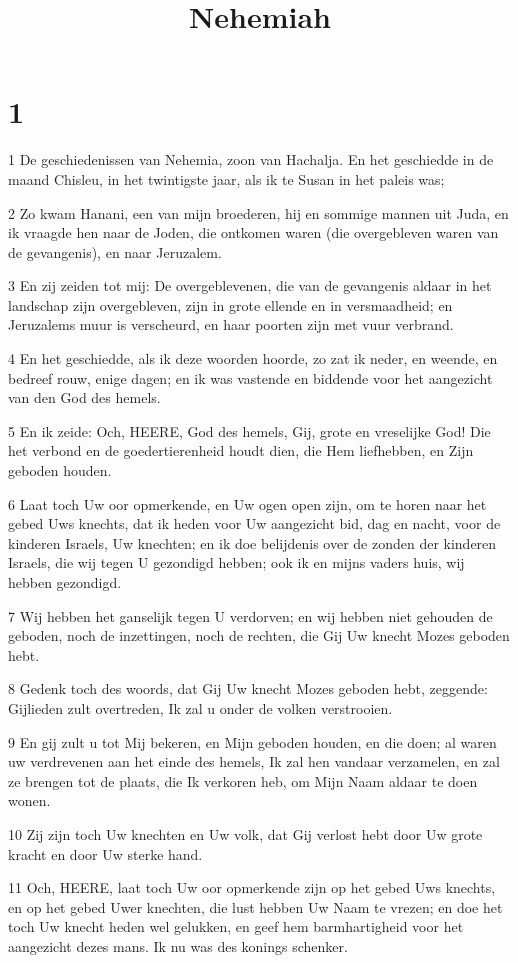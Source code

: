

\title{Nehemiah}



\chapter{1}

\par 1 De geschiedenissen van Nehemia, zoon van Hachalja. En het geschiedde in de maand Chisleu, in het twintigste jaar, als ik te Susan in het paleis was;
\par 2 Zo kwam Hanani, een van mijn broederen, hij en sommige mannen uit Juda, en ik vraagde hen naar de Joden, die ontkomen waren (die overgebleven waren van de gevangenis), en naar Jeruzalem.
\par 3 En zij zeiden tot mij: De overgeblevenen, die van de gevangenis aldaar in het landschap zijn overgebleven, zijn in grote ellende en in versmaadheid; en Jeruzalems muur is verscheurd, en haar poorten zijn met vuur verbrand.
\par 4 En het geschiedde, als ik deze woorden hoorde, zo zat ik neder, en weende, en bedreef rouw, enige dagen; en ik was vastende en biddende voor het aangezicht van den God des hemels.
\par 5 En ik zeide: Och, HEERE, God des hemels, Gij, grote en vreselijke God! Die het verbond en de goedertierenheid houdt dien, die Hem liefhebben, en Zijn geboden houden.
\par 6 Laat toch Uw oor opmerkende, en Uw ogen open zijn, om te horen naar het gebed Uws knechts, dat ik heden voor Uw aangezicht bid, dag en nacht, voor de kinderen Israels, Uw knechten; en ik doe belijdenis over de zonden der kinderen Israels, die wij tegen U gezondigd hebben; ook ik en mijns vaders huis, wij hebben gezondigd.
\par 7 Wij hebben het ganselijk tegen U verdorven; en wij hebben niet gehouden de geboden, noch de inzettingen, noch de rechten, die Gij Uw knecht Mozes geboden hebt.
\par 8 Gedenk toch des woords, dat Gij Uw knecht Mozes geboden hebt, zeggende: Gijlieden zult overtreden, Ik zal u onder de volken verstrooien.
\par 9 En gij zult u tot Mij bekeren, en Mijn geboden houden, en die doen; al waren uw verdrevenen aan het einde des hemels, Ik zal hen vandaar verzamelen, en zal ze brengen tot de plaats, die Ik verkoren heb, om Mijn Naam aldaar te doen wonen.
\par 10 Zij zijn toch Uw knechten en Uw volk, dat Gij verlost hebt door Uw grote kracht en door Uw sterke hand.
\par 11 Och, HEERE, laat toch Uw oor opmerkende zijn op het gebed Uws knechts, en op het gebed Uwer knechten, die lust hebben Uw Naam te vrezen; en doe het toch Uw knecht heden wel gelukken, en geef hem barmhartigheid voor het aangezicht dezes mans. Ik nu was des konings schenker.

